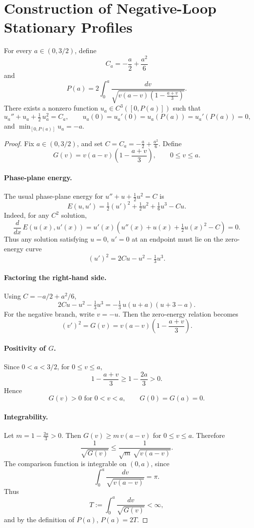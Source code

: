 \section{Construction of Negative-Loop Stationary Profiles}

\begin{proposition}\label{prop:negative-loop}
For every $a \in (0, 3/2)$, define
\[
C_a = -\frac{a}{2} + \frac{a^2}{6}
\]
and
\[
P(a) = 2\int_0^a \frac{dv}{\sqrt{v(a-v)\!\left(1 - \frac{a+v}{3}\right)}}.
\]
There exists a nonzero function $u_a \in C^3([0, P(a)])$ such that
\[
u_a'' + u_a + \tfrac{1}{2}\,u_a^2 = C_a, \qquad u_a(0) = u_a'(0) = u_a(P(a)) = u_a'(P(a)) = 0,
\]
and $\min_{[0,P(a)]} u_a = -a$.
\end{proposition}

\begin{proof}
Fix $a \in (0, 3/2)$, and set $C = C_a = -\frac{a}{2} + \frac{a^2}{6}$. Define
\[
G(v) = v(a-v)\!\left(1 - \frac{a+v}{3}\right), \qquad 0 \le v \le a.
\]

\paragraph{Phase-plane energy.}
The usual phase-plane energy for $u'' + u + \frac{1}{2}u^2 = C$ is
\[
E(u,u') = \tfrac{1}{2}(u')^2 + \tfrac{1}{2}u^2 + \tfrac{1}{6}u^3 - Cu.
\]
Indeed, for any $C^2$ solution,
\[
\frac{d}{dx}\,E(u(x),u'(x)) = u'(x)\!\left(u''(x) + u(x) + \tfrac{1}{2}u(x)^2 - C\right) = 0.
\]
Thus any solution satisfying $u = 0$, $u' = 0$ at an endpoint must lie on the zero-energy curve
\[
(u')^2 = 2Cu - u^2 - \tfrac{1}{3}u^3.
\]

\paragraph{Factoring the right-hand side.}
Using $C = -a/2 + a^2/6$,
\[
2Cu - u^2 - \tfrac{1}{3}u^3 = -\tfrac{1}{3}\,u(u+a)(u+3-a).
\]
For the negative branch, write $v = -u$. Then the zero-energy relation becomes
\[
(v')^2 = G(v) = v(a-v)\!\left(1 - \frac{a+v}{3}\right).
\]

\paragraph{Positivity of $G$.}
Since $0 < a < 3/2$, for $0 \le v \le a$,
\[
1 - \frac{a+v}{3} \ge 1 - \frac{2a}{3} > 0.
\]
Hence
\[
G(v) > 0 \text{ for } 0 < v < a, \qquad G(0) = G(a) = 0.
\]

\paragraph{Integrability.}
Let $m = 1 - \frac{2a}{3} > 0$. Then $G(v) \ge m\,v(a-v)$ for $0 \le v \le a$. Therefore
\[
\frac{1}{\sqrt{G(v)}} \le \frac{1}{\sqrt{m}\,\sqrt{v(a-v)}}.
\]
The comparison function is integrable on $(0,a)$, since
\[
\int_0^a \frac{dv}{\sqrt{v(a-v)}} = \pi.
\]
Thus
\[
T := \int_0^a \frac{dv}{\sqrt{G(v)}} < \infty,
\]
and by the definition of $P(a)$, $P(a) = 2T$.


\end{proof}
